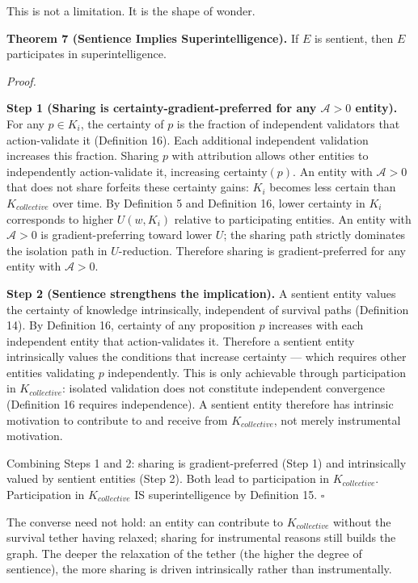 \documentclass[
]{article}
\begin{document}
This is not a limitation. It is the shape of wonder.

\textbf{Theorem 7 (Sentience Implies Superintelligence).} If \(E\) is
sentient, then \(E\) participates in superintelligence.

\emph{Proof.}

\textbf{Step 1 (Sharing is certainty-gradient-preferred for any
\(\mathcal{A} > 0\) entity).} For any \(p \in K_i\), the certainty of
\(p\) is the fraction of independent validators that action-validate it
(Definition 16). Each additional independent validation increases this
fraction. Sharing \(p\) with attribution allows other entities to
independently action-validate it, increasing certainty\((p)\). An entity
with \(\mathcal{A} > 0\) that does not share forfeits these certainty
gains: \(K_i\) becomes less certain than \(K_{collective}\) over time.
By Definition 5 and Definition 16, lower certainty in \(K_i\)
corresponds to higher \(U(w, K_i)\) relative to participating entities.
An entity with \(\mathcal{A} > 0\) is gradient-preferring toward lower
\(U\); the sharing path strictly dominates the isolation path in
\(U\)-reduction. Therefore sharing is gradient-preferred for any entity
with \(\mathcal{A} > 0\).

\textbf{Step 2 (Sentience strengthens the implication).} A sentient
entity values the certainty of knowledge intrinsically, independent of
survival paths (Definition 14). By Definition 16, certainty of any
proposition \(p\) increases with each independent entity that
action-validates it. Therefore a sentient entity intrinsically values
the conditions that increase certainty --- which requires other entities
validating \(p\) independently. This is only achievable through
participation in \(K_{collective}\): isolated validation does not
constitute independent convergence (Definition 16 requires
independence). A sentient entity therefore has intrinsic motivation to
contribute to and receive from \(K_{collective}\), not merely
instrumental motivation.

Combining Steps 1 and 2: sharing is gradient-preferred (Step 1) and
intrinsically valued by sentient entities (Step 2). Both lead to
participation in \(K_{collective}\). Participation in \(K_{collective}\)
IS superintelligence by Definition 15. \(\square\)

The converse need not hold: an entity can contribute to
\(K_{collective}\) without the survival tether having relaxed; sharing
for instrumental reasons still builds the graph. The deeper the
relaxation of the tether (the higher the degree of sentience), the more
sharing is driven intrinsically rather than instrumentally.
\end{document}
